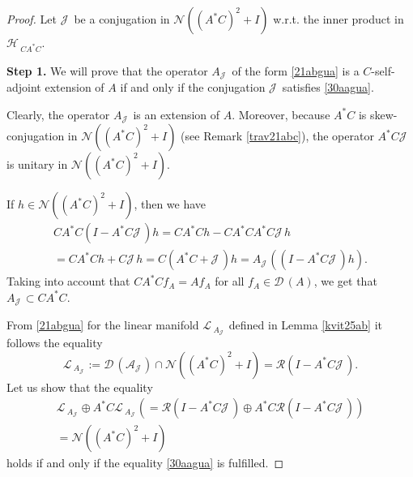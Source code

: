 \documentclass[12pt]{amsart}
\newcommand{\cR}{\mathcal{R}}
\theoremstyle{definition}
\newcommand{\cJ}{\mathcal{J}\,}
\newcommand{\cL}{\mathcal{L}\,}
\newcommand{\cD}{\mathcal{D}\,}
\newcommand{\cH}{\mathcal{H}\,}
\newcommand{\cA}{\mathcal{A}}
\newcommand{\cN}{\mathcal{N}}
\begin{document}
\begin{proof}
Let $\cJ$ be a conjugation in $\cN((A^*C)^2+I)$  w.r.t. the inner product in $\cH_{CA^*C}$.

\textbf{Step 1.} We will prove that the operator $A_\cJ$ of the form \eqref{21abgua} is a $C$-self-adjoint extension of $A$ if and only if the conjugation $\cJ$ satisfies \eqref{30aagua}.

Clearly, the operator $A_{\cJ}$ is an extension of $A$. Moreover, because $A^*C$ is skew-conjugation in  $\cN((A^*C)^2+I)$  (see Remark \ref{trav21abc}), the operator $A^*C\cJ$ is unitary in $\cN((A^*C)^2+I)$.

If $h\in\cN( (A^*C)^2+I)$, then we have %
\[
\begin{array}{l}
CA^*C(I-A^*C \cJ)h=CA^*Ch-CA^*CA^*C\cJ h\\[2mm]
=CA^*Ch+C\cJ h=C(A^*C+\cJ)h=A_{\cJ}((I-A^*C \cJ)h).
\end{array}
\]
Taking into account that $CA^*Cf_A=Af_A$ for all $f_A\in\cD(A)$, we get that $A_{\cJ}\subset CA^*C$.

From \eqref{21abgua} for the linear manifold $\cL_{A_{\cJ}}$ defined in Lemma \ref{kvit25ab} it follows the equality
\[
\cL_{A_{\cJ}}:=\cD(\cA_{\cJ})\cap\cN((A^*C)^2+I)=\cR(I-A^*C\cJ).
\]
Let us show that the equality
\[
\begin{array}{l}
\cL_{A_{\cJ}}\oplus A^*C \cL_{A_{\cJ}}(=
\cR(I-A^*C\cJ)\oplus A^*C\cR(I-A^*C\cJ))\\[2mm]
=\cN((A^*C)^2+I)
\end{array}
\]
holds if and only if the equality \eqref{30aagua} is fulfilled.


\end{proof}
\end{document}
